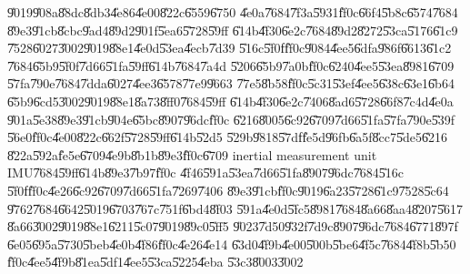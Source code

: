 \documentclass[12pt,a4paper]{article}
\begin{document}
\bigskip

\U{9019}\U{908a}\U{88dc}\U{8db3}\U{4e86}\U{4e00}\U{822c}\U{6559}\U{6750}%
\U{4e0a}\U{7684}\U{7f3a}\U{5931}\U{ff0c}\U{66f4}\U{5b8c}\U{6574}\U{7684}%
\U{89e3}\U{91cb}\U{8cbc}\U{9ad4}\U{89d2}\U{901f}\U{5ea6}\U{5728}\U{59ff}%
\U{614b}\U{4f30}\U{6e2c}\U{7684}\U{89d2}\U{8272}\U{53ca}\U{5176}\U{61c9}%
\U{7528}\U{6027}\U{3002}\U{9019}\U{88e1}\U{4e0d}\U{53ea}\U{4ecb}\U{7d39}%
\U{516c}\U{5f0f}\U{ff0c}\U{9084}\U{4ee5}\U{6dfa}\U{986f}\U{6613}\U{61c2}%
\U{7684}\U{65b9}\U{5f0f}\U{7d66}\U{51fa}\U{59ff}\U{614b}\U{7684}\U{7a4d}%
\U{5206}\U{65b9}\U{7a0b}\U{ff0c}\U{6240}\U{4ee5}\U{53ea}\U{8981}\U{6709}%
\U{57fa}\U{790e}\U{7684}\U{7dda}\U{6027}\U{4ee3}\U{6578}\U{77e9}\U{9663}%
\U{77e5}\U{8b58}\U{ff0c}\U{5c31}\U{53ef}\U{4ee5}\U{638c}\U{63e1}\U{6b64}%
\U{65b9}\U{6cd5}\U{3002}\U{9019}\U{88e1}\U{8a73}\U{8ff0}\U{7684}\U{59ff}%
\U{614b}\U{4f30}\U{6e2c}\U{7406}\U{8ad6}\U{5728}\U{66f8}\U{7c4d}\U{4e0a}%
\U{901a}\U{5e38}\U{89e3}\U{91cb}\U{904e}\U{65bc}\U{8907}\U{96dc}\U{ff0c}%
\U{6216}\U{8005}\U{6c92}\U{6709}\U{7d66}\U{51fa}\U{57fa}\U{790e}\U{539f}%
\U{56e0}\U{ff0c}\U{4e00}\U{822c}\U{662f}\U{5728}\U{59ff}\U{614b}\U{52d5}%
\U{529b}\U{9818}\U{57df}\U{fe5d}\U{96fb}\U{6a5f}\U{8cc7}\U{5de5}\U{6216}%
\U{822a}\U{592a}\U{fe5e}\U{6709}\U{4e9b}\U{8b1b}\U{89e3}\U{ff0c}\U{6709}%
inertial measurement unit IMU\U{7684}\U{59ff}\U{614b}\U{89e3}\U{7b97}\U{ff0c}%
\U{4f46}\U{591a}\U{53ea}\U{7d66}\U{51fa}\U{8907}\U{96dc}\U{7684}\U{516c}%
\U{5f0f}\U{ff0c}\U{4e26}\U{6c92}\U{6709}\U{7d66}\U{51fa}\U{7269}\U{7406}%
\U{89e3}\U{91cb}\U{ff0c}\U{9019}\U{6a23}\U{5728}\U{61c9}\U{7528}\U{5c64}%
\U{9762}\U{7684}\U{6642}\U{5019}\U{6703}\U{767c}\U{751f}\U{6bd4}\U{8f03}%
\U{591a}\U{4e0d}\U{5fc5}\U{8981}\U{7684}\U{8a66}\U{8aa4}\U{8207}\U{5617}%
\U{8a66}\U{3002}\U{9019}\U{88e1}\U{6211}\U{5c07}\U{9019}\U{89c0}\U{5ff5}%
\U{9023}\U{7d50}\U{932f}\U{7d9c}\U{8907}\U{96dc}\U{7684}\U{6771}\U{897f}%
\U{6e05}\U{695a}\U{5730}\U{5beb}\U{4e0b}\U{4f86}\U{ff0c}\U{4e26}\U{4e14}%
\U{63d0}\U{4f9b}\U{4e00}\U{500b}\U{5be6}\U{4f5c}\U{7684}\U{4f8b}\U{5b50}%
\U{ff0c}\U{4ee5}\U{4f9b}\U{81ea}\U{5df1}\U{4ee5}\U{53ca}\U{5225}\U{4eba}%
\U{53c3}\U{8003}\U{3002}

\bigskip
\end{document}
